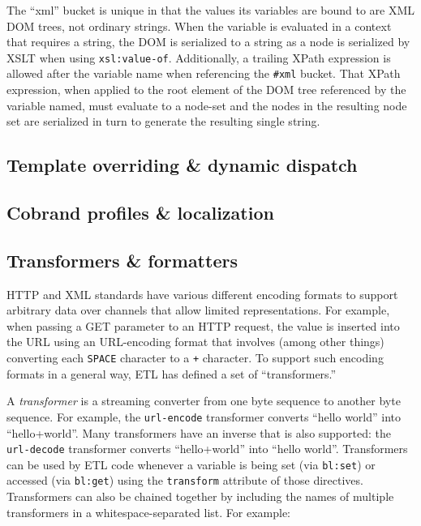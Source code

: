 \documentclass{www2003-submission}
\newcommand{\smtexttt}[1]{{\small\texttt{#1}}}
\begin{document}
The ``xml'' bucket is unique in that the values its variables are bound
to are XML DOM trees, not ordinary strings.  When the variable is
evaluated in a context that requires a string, the DOM is serialized to
a string as a node is serialized by XSLT when using
\smtexttt{xsl:value-of}.  Additionally, a trailing XPath expression is
allowed after the variable name when referencing the \smtexttt{\#xml}
bucket.  That XPath expression, when applied to the root element of the
DOM tree referenced by the variable named, must evaluate to a node-set
and the nodes in the resulting node set are serialized in turn to
generate the resulting single string.


\subsection{Template overriding \& dynamic dispatch}
\label{ssec-template-dispatch}


\subsection{Cobrand profiles \& localization}
\label{ssec-cobrand-profiles}

\subsection{Transformers \& formatters}
\label{ssec-transformers}

HTTP and XML standards have various different encoding formats to
support arbitrary data over channels that allow limited
representations.  For example, when passing a GET parameter to an HTTP
request, the value is inserted into the URL using an URL-encoding format
that involves (among other things) converting each \smtexttt{SPACE}
character to a \smtexttt{+} character.  To support such encoding formats
in a general way, ETL has defined a set of ``transformers.''  

A \emph{transformer} is a streaming converter from one byte sequence to
another byte sequence.  For example, the \smtexttt{url-encode}
transformer converts ``hello world'' into ``hello+world''.  Many
transformers have an inverse that is also supported: the
\smtexttt{url-decode} transformer converts ``hello+world'' into ``hello
world''.  Transformers can be used by ETL code whenever a variable is
being set (via \smtexttt{bl:set}) or accessed (via \smtexttt{bl:get})
using the \smtexttt{transform} attribute of those directives.
Transformers can also be chained together by including the names of
multiple transformers in a whitespace-separated list.  For example:
\end{document}
